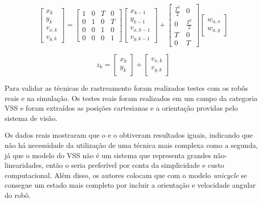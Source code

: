\documentclass[acronym, symbols, table]{fei}
\begin{document}
		\begin{equation}\label{eq:differential_equation_vsss_3}
			\begin{bmatrix}
				x_k \\ y_k \\ v_{x,k} \\ v_{y,k}
			\end{bmatrix} = 
			\begin{bmatrix}
				1 & 0 & T & 0 \\
				0 & 1 & 0 & T \\
				0 & 0 & 1 & 0 \\
				0 & 0 & 0 & 1
			\end{bmatrix}
			\begin{bmatrix}
				x_{k-1} \\ y_{k-1} \\ v_{x,k-1} \\ v_{y,k-1}
			\end{bmatrix} + 
			\begin{bmatrix}
				\frac{T^{2}}{2} & 0 \\
				0 & \frac{T^{2}}{2} \\
				T & 0 \\
				0 & T
			\end{bmatrix}
			\begin{bmatrix}
				w_{a,x} \\
				w_{a,y}
			\end{bmatrix}
		\end{equation}
		
		\begin{equation}\label{eq:differential_equation_vsss_4}
			z_k = 
			\begin{bmatrix}
				x_k \\ y_k
			\end{bmatrix} + 
			\begin{bmatrix}
				v_{x,k} \\ v_{y,k}
			\end{bmatrix}
		\end{equation}
		
	Para validar as técnicas de rastreamento foram realizados testes com os robôs reais e na simulação. Os testes reais foram realizados em um campo da categoria VSS e foram extraídos as posições cartesianas e a orientação providas pelo sistema de visão.
	
	Os dados reais mostraram que o  e o  obtiveram resultados iguais, indicando que não há necessidade da utilização de uma técnica mais complexa como a segunda, já que o modelo do VSS não é um sistema que representa grandes não-linearidades, então o  seria preferível por conta da simplicidade e custo computacional. Além disso, os autores colocam que com o modelo \textit{unicycle} se consegue um estado mais completo por incluir a orientação e velocidade angular do robô.
	
\end{document}
